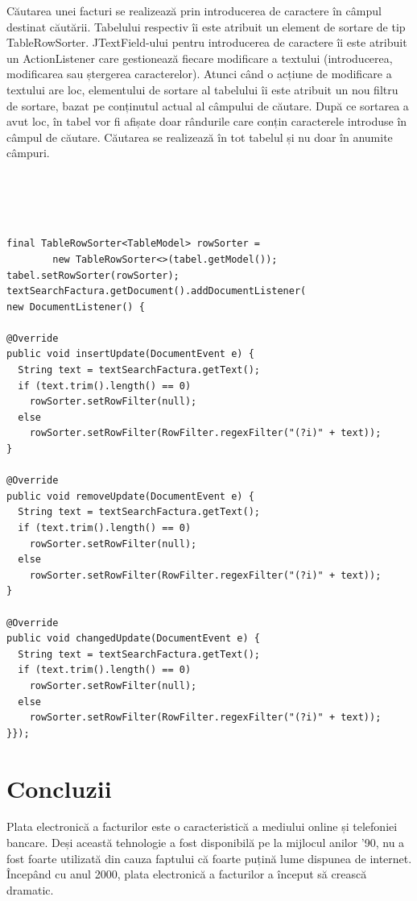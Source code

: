 \documentclass[12pt]{book}
\begin{document}
Căutarea unei facturi se realizează prin introducerea de caractere în câmpul destinat căutării. Tabelului respectiv îi este atribuit un element de sortare de tip TableRowSorter. JTextField-ului pentru introducerea de caractere îi este atribuit un ActionListener care gestionează fiecare modificare a textului (introducerea, modificarea sau ștergerea caracterelor). Atunci când o acțiune de modificare a textului are loc, elementului de sortare al tabelului îi este atribuit un nou filtru de sortare, bazat pe conținutul actual al câmpului de căutare. După ce sortarea a avut loc, în tabel vor fi afișate doar rândurile care conțin caracterele introduse în câmpul de căutare. Căutarea se realizează în tot tabelul și nu doar în anumite câmpuri.\\\\\\\\\\
\begin{lstlisting}[frame=single, caption=Căutarea în tabel]
final TableRowSorter<TableModel> rowSorter = 
		new TableRowSorter<>(tabel.getModel());
tabel.setRowSorter(rowSorter);
textSearchFactura.getDocument().addDocumentListener(
new DocumentListener() {

@Override
public void insertUpdate(DocumentEvent e) {
  String text = textSearchFactura.getText();
  if (text.trim().length() == 0)
    rowSorter.setRowFilter(null);
  else 
    rowSorter.setRowFilter(RowFilter.regexFilter("(?i)" + text));
}

@Override
public void removeUpdate(DocumentEvent e) {
  String text = textSearchFactura.getText();
  if (text.trim().length() == 0)
    rowSorter.setRowFilter(null);
  else 
    rowSorter.setRowFilter(RowFilter.regexFilter("(?i)" + text));
}

@Override
public void changedUpdate(DocumentEvent e) {
  String text = textSearchFactura.getText();
  if (text.trim().length() == 0)
    rowSorter.setRowFilter(null);
  else 
    rowSorter.setRowFilter(RowFilter.regexFilter("(?i)" + text));
}});
\end{lstlisting}

\chapter{Concluzii}

Plata electronică a facturilor este o caracteristică a mediului online și telefoniei bancare. Deși această tehnologie a fost disponibilă pe la mijlocul anilor  '90, nu a fost foarte utilizată din cauza faptului că foarte puțină lume dispunea de internet. Începând cu anul 2000, plata electronică a facturilor a început să crească dramatic. 
\end{document}
